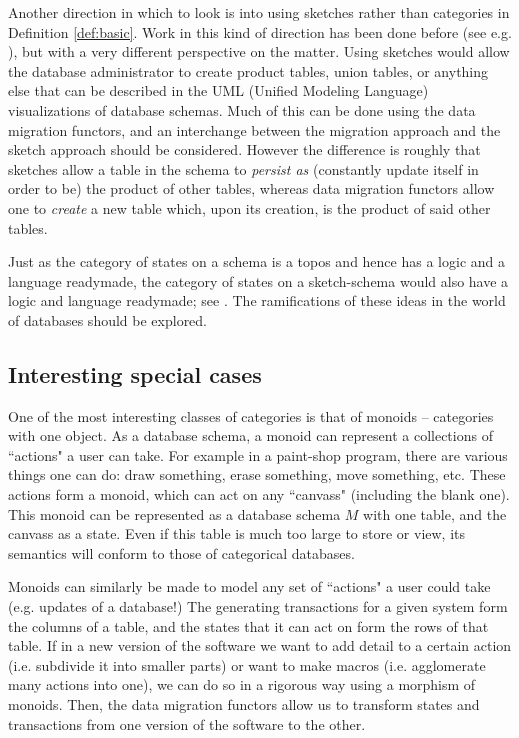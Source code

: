 \documentclass{amsart}
\theoremstyle{remark}
\theoremstyle{definition}
\begin{document}
Another direction in which to look is into using sketches rather than categories in Definition \ref{def:basic}.  Work in this kind of direction has been done before (see e.g. \cite{JRW}), but with a very different perspective on the matter.  Using sketches would allow the database administrator to create product tables, union tables, or anything else that can be described in the UML (Unified Modeling Language) visualizations of database schemas.  Much of this can be done using the data migration functors, and an interchange between the migration approach and the sketch approach should be considered.  However the difference is roughly that sketches allow a table in the schema to {\em persist as} (constantly update itself in order to be) the product of other tables, whereas data migration functors allow one to {\em create} a new table which, upon its creation, is the product of said other tables.

Just as the category of states on a schema is a topos and hence has a logic and a language readymade, the category of states on a sketch-schema would also have a logic and language readymade; see \cite{AF}.  The ramifications of these ideas in the world of databases should be explored.

\subsection{Interesting special cases}\label{sec:future2}

One of the most interesting classes of categories is that of monoids -- categories with one object.  As a database schema, a monoid can represent a collections of ``actions" a user can take.  For example in a paint-shop program, there are various things one can do: draw something, erase something, move something, etc.  These actions form a monoid, which can act on any ``canvass" (including the blank one).  This monoid can be represented as a database schema $M$ with one table, and the canvass as a state.  Even if this table is much too large to store or view, its semantics will conform to those of categorical databases.  

Monoids can similarly be made to model any set of ``actions" a user could take (e.g. updates of a database!)  The generating transactions for a given system form the columns of a table, and the states that it can act on form the rows of that table.  If in a new version of the software we want to add detail to a certain action (i.e. subdivide it into smaller parts) or want to make macros (i.e. agglomerate many actions into one), we can do so in a rigorous way using a morphism of monoids.  Then, the data migration functors allow us to transform states and transactions from one version of the software to the other.
\end{document}

